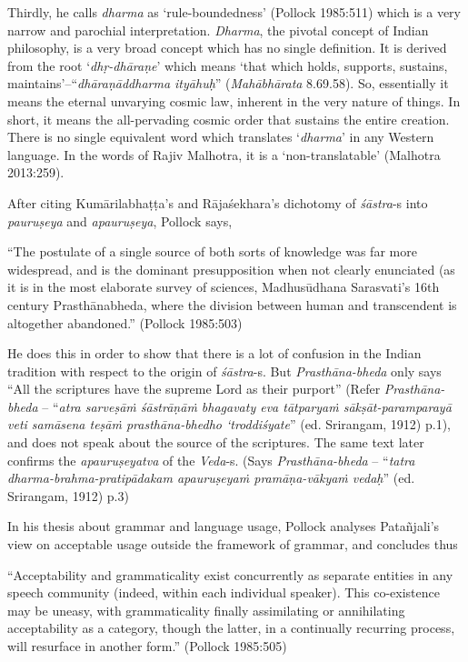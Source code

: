 Thirdly, he calls {\it dharma} as `rule-boundedness' (Pollock 1985:511) which is a very narrow and parochial interpretation. {\it Dharma}, the pivotal concept of Indian philosophy, is a very broad concept which has no single definition. It is derived from the root `\textit{dhṛ-dhāraṇe}' which means `that which holds, supports, sustains, maintains'--``\textit{dhāraṇāddharma ityāhuḥ}'' ({\it Mahābhārata} 8.69.58). So, essentially it means the eternal unvarying cosmic law, inherent in the very nature of things. In short, it means the all-pervading cosmic order that sustains the entire creation. There is no single equivalent word which translates `{\it dharma}' in any Western language. In the words of Rajiv Malhotra, it is a `non-translatable' (Malhotra 2013:259).

After citing Kumārilabhaṭṭa's and Rājaśekhara's dichotomy of {\it śāstra}-s into {\it pauruṣeya} and {\it apauruṣeya}, Pollock says,
\begin{myquote}
``The postulate of a single source of both sorts of knowledge was far more widespread, and is the dominant presupposition when not clearly enunciated (as it is in the most elaborate survey of sciences, Madhusūdhana Sarasvati's 16th century Prasthānabheda, where the division between human and transcendent is altogether abandoned.'' (Pollock 1985:503)
\end{myquote}

He does this in order to show that there is a lot of confusion in the Indian tradition with respect to the origin of {\it śāstra}-s. But \textit{Prasthāna-bheda} only says ``All the scriptures have the supreme Lord as their purport'' (Refer \textit{Prasthāna-bheda} -- ``\textit{atra sarveṣāṁ śāstrāṇāṁ bhagavaty eva tātparyaṁ sākṣāt-paramparayā veti samāsena teṣāṁ prasthāna-bhedho `troddiśyate}'' (ed. Srirangam, 1912) p.1), and does not speak about the source of the scriptures. The same text later confirms the {\it apauruṣeyatva} of the {\it Veda}-s. (Says \textit{Prasthāna-bheda} -- ``\textit{tatra dharma-brahma-pratipādakam apauruṣeyaṁ pramāṇa-vākyaṁ vedaḥ}'' (ed. Srirangam, 1912) p.3)

In his thesis about grammar and language usage, Pollock analyses Patañjali’s view on acceptable usage outside the framework of grammar, and concludes thus
\begin{myquote}
``Acceptability and grammaticality exist concurrently as separate entities in any speech community (indeed, within each individual speaker). This co-existence may be uneasy, with grammaticality finally assimilating or annihilating acceptability as a category, though the latter, in a continually recurring process, will resurface in another form.'' (Pollock 1985:505)
\end{myquote}


